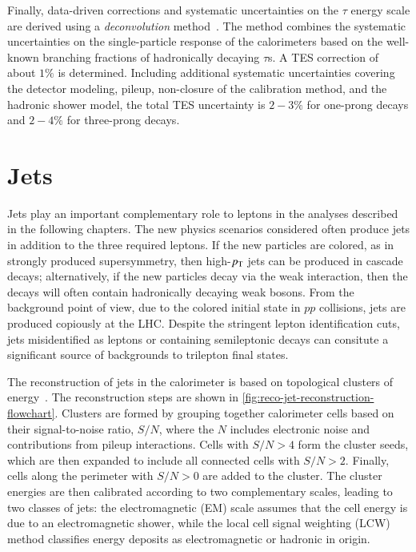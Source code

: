 Finally, data-driven corrections and systematic uncertainties on the $\tau$ energy scale are derived using a \emph{deconvolution} method~\cite{TheATLASCollaboration:2011ks}. The method combines the systematic uncertainties on the single-particle response of the calorimeters based on the well-known branching fractions of hadronically decaying $\tau$s. A TES correction of about $1\%$ is determined. Including additional systematic uncertainties covering the detector modeling, pileup, non-closure of the calibration method, and the hadronic shower model, the total TES uncertainty is $2-3\%$ for one-prong decays and $2-4\%$ for three-prong decays.

\section{Jets}\label{sec:reco-jets}
Jets play an important complementary role to leptons in the analyses described in the following chapters. The new physics scenarios considered often produce jets in addition to the three required leptons. If the new particles are colored, as in strongly produced supersymmetry, then high-$p_{\text{T}}$ jets can be produced in cascade decays; alternatively, if the new particles decay via the weak interaction, then the decays will often contain hadronically decaying weak bosons. From the background point of view, due to the colored initial state in $pp$ collisions, jets are produced copiously at the LHC. Despite the stringent lepton identification cuts, jets misidentified as leptons or containing semileptonic decays can consitute a significant source of backgrounds to trilepton final states.

The reconstruction of jets in the calorimeter is based on topological clusters of energy~\cite{TheATLASCollaboration:2011ks,TheATLASCollaboration:2015ds}. The reconstruction steps are shown in \ref{fig:reco-jet-reconstruction-flowchart}. Clusters are formed by grouping together calorimeter cells based on their signal-to-noise ratio, $S/N$, where the $N$ includes electronic noise and contributions from pileup interactions. Cells with $S/N>4$ form the cluster seeds, which are then expanded to include all connected cells with $S/N>2$. Finally, cells along the perimeter with $S/N>0$ are added to the cluster. The cluster energies are then calibrated according to two complementary scales, leading to two classes of jets: the electromagnetic (EM) scale assumes that the cell energy is due to an electromagnetic shower, while the local cell signal weighting (LCW) method classifies energy deposits as electromagnetic or hadronic in origin. 

